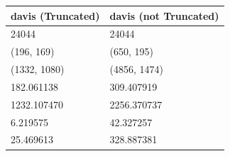 \begin{tabular}{ll}
\toprule
davis (Truncated) & davis (not Truncated) \\
\midrule
24044 & 24044 \\
(196, 169) & (650, 195) \\
(1332, 1080) & (4856, 1474) \\
182.061138 & 309.407919 \\
1232.107470 & 2256.370737 \\
6.219575 & 42.327257 \\
25.469613 & 328.887381 \\
\bottomrule
\end{tabular}
